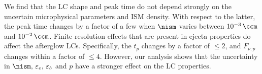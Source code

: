 We find that the \ac{LC} shape and peak time do not depend strongly on the 
uncertain microphysical parameters and \ac{ISM} density. With respect to the latter, 
the peak time changes by a factor of a few when $\nism$ varies between 
$10^{-3}\, \ccm$ and $10^{-2}\,\ccm$.
Finite resolution effects that are present in ejecta properties do affect the 
afterglow \acp{LC}. Specifically, the $t_p$ changes by a factor of 
${\leq2}$, and $F_{\nu;p}$ changes within a factor of ${\leq4}$. However, 
our analysis shows that the uncertainty in $\nism,\,\varepsilon_e,\,\varepsilon_b$ 
and $p$ have a stronger effect on the \ac{LC} properties. 

%

